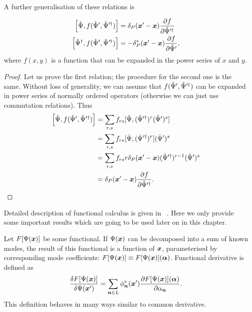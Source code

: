 A further generalisation of these relations is
\begin{lemma}
\label{lmm:formalism:func-aux:functional-commutators}
\begin{equation*}
\begin{split}
	\left[ \hat{\Psi}, f( \hat{\Psi}^\prime, \hat{\Psi}^{\prime\dagger} ) \right]
	& = \delta_P (\boldsymbol{x}^\prime - \boldsymbol{x}) \frac{\partial f}{\partial \hat{\Psi}^{\prime\dagger}} \\
	\left[ \hat{\Psi}^\dagger, f( \hat{\Psi}^\prime, \hat{\Psi}^{\prime\dagger} ) \right]
	& = -\delta_P^* (\boldsymbol{x}^\prime - \boldsymbol{x}) \frac{\partial f}{\partial \hat{\Psi}^\prime},
\end{split}
\end{equation*}
where $f(x, y)$ is a function that can be expanded in the power series of $x$ and $y$.
\end{lemma}
\begin{proof}
Let us prove the first relation; the procedure for the second one is the same.
Without loss of generality, we can assume that $f(\hat{\Psi}^\prime, \hat{\Psi}^{\prime\dagger})$ can be expanded in power series of normally ordered operators (otherwise we can just use commutation relations).
Thus
\begin{equation*}
\begin{split}
	\left[ \hat{\Psi}, f( \hat{\Psi}^\prime, \hat{\Psi}^{\prime\dagger} ) \right]
	& = \sum\limits_{r,s} f_{rs} [ \hat{\Psi}, (\hat{\Psi}^{\prime\dagger})^r (\hat{\Psi}^\prime)^s ] \\
	& = \sum\limits_{r,s} f_{rs} [ \hat{\Psi}, (\hat{\Psi}^{\prime\dagger})^r ] (\hat{\Psi}^\prime)^s \\
	& = \sum\limits_{r,s} f_{rs} r \delta_P(\boldsymbol{x}^\prime - \boldsymbol{x})
		(\hat{\Psi}^{\prime\dagger})^{r-1} (\hat{\Psi}^\prime)^s \\
	& = \delta_P (\boldsymbol{x}^\prime - \boldsymbol{x}) \frac{\partial f}{\partial \hat{\Psi}^{\prime\dagger}}.
	\qedhere
\end{split}
\end{equation*}
\end{proof}

Detailed description of functional calculus is given in~\cite{Dalton2011} .
Here we only provide some important results which are going to be used later on in this chapter.

Let $F[\Psi(\boldsymbol{x})]$ be some functional.
If $\Psi(\boldsymbol{x})$ can be decomposed into a sum of known modes, the result of this functional is a function of $\boldsymbol{x}$, parameterised by corresponding mode coefficients: $F[\Psi(\boldsymbol{x})] \equiv F[\Psi(\boldsymbol{x})](\bm{\alpha})$.
Functional derivative is defined as
\begin{equation}
\label{eqn:formalism:func-aux:func-diff}
	\frac{\delta F[\Psi(\boldsymbol{x})]}{\delta \Psi(\boldsymbol{x}^\prime)}
	= \sum\limits_{\boldsymbol{n} \in L} \phi_{\boldsymbol{n}}^* (\boldsymbol{x}^\prime)
		\frac{\partial F[\Psi(\boldsymbol{x})](\bm{\alpha})}{\partial \alpha_{\boldsymbol{n}}}.
\end{equation}
This definition behaves in many ways similar to common derivative.

